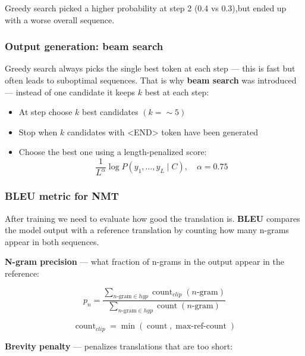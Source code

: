 \documentclass[10pt]{article}
\begin{document}
Greedy search picked a higher probability at step 2 (0.4 vs 0.3),but ended up with a worse overall sequence.

\subsubsection{Output generation: beam search}

Greedy search always picks the single best token at each step --- this is fast but often leads to suboptimal sequences. That is why \textbf{beam search} was introduced --- instead of one candidate it keeps $k$ best at each step:

\begin{itemize}
    \item At step choose $k$ best candidates $(k=\sim 5)$
    \item Stop when $k$ candidates with <END> token have been generated
    \item Choose the best one using a length-penalized score:
    \begin{equation*}
        \frac{1}{L^{\alpha}} \log P(y_1, \ldots, y_L \mid C), \quad \alpha = 0.75
    \end{equation*}
\end{itemize}


\subsubsection{BLEU metric for NMT}

After training we need to evaluate how good the translation is.
\textbf{BLEU} compares the model output with a reference
translation by counting how many n-grams appear in both sequences.

\textbf{N-gram precision} --- what fraction of n-grams in the output appear in the reference:

\begin{equation*}
p_n = \frac{\sum_{n\text{-gram} \in hyp} \operatorname{count}_{clip}(n\text{-gram})}
           {\sum_{n\text{-gram} \in hyp} \operatorname{count}(n\text{-gram})}
\end{equation*}

\begin{equation*}
\operatorname{count}_{clip}=\min(\operatorname{count}, \operatorname{max-re f-count})
\end{equation*}

\textbf{Brevity penalty} --- penalizes translations that are too short:
\end{document}
